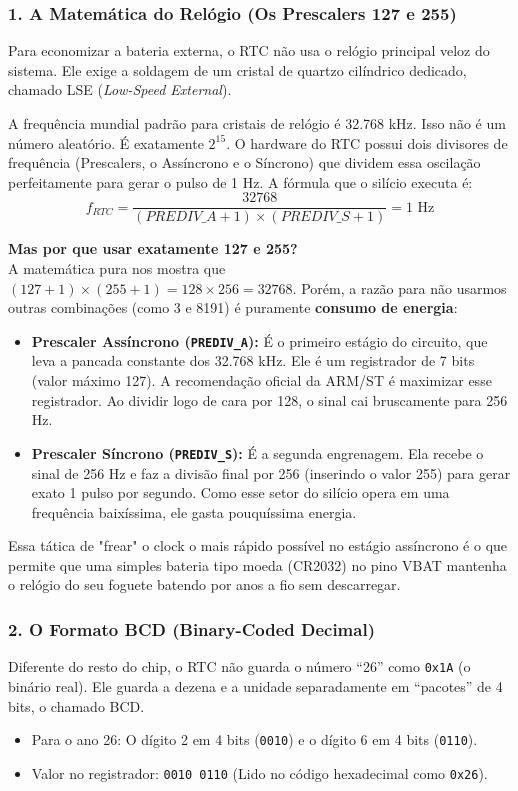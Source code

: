 \documentclass[12pt,a4paper]{article}
\begin{document}
\subsubsection*{1. A Matemática do Relógio (Os Prescalers 127 e 255)}
Para economizar a bateria externa, o RTC não usa o relógio principal veloz do sistema. Ele exige a soldagem de um cristal de quartzo cilíndrico dedicado, chamado LSE (\textit{Low-Speed External}).

A frequência mundial padrão para cristais de relógio é 32.768 kHz. Isso não é um número aleatório. É exatamente $2^{15}$. O hardware do RTC possui dois divisores de frequência (Prescalers, o Assíncrono e o Síncrono) que dividem essa oscilação perfeitamente para gerar o pulso de 1 Hz. A fórmula que o silício executa é:
$$f_{RTC} = \frac{32768}{(PREDIV\_A + 1) \times (PREDIV\_S + 1)} = 1 \text{ Hz}$$

\textbf{Mas por que usar exatamente 127 e 255?} \\
A matemática pura nos mostra que $(127 + 1) \times (255 + 1) = 128 \times 256 = 32768$. Porém, a razão para não usarmos outras combinações (como 3 e 8191) é puramente \textbf{consumo de energia}:
\begin{itemize}
    \item \textbf{Prescaler Assíncrono (\texttt{PREDIV\_A}):} É o primeiro estágio do circuito, que leva a pancada constante dos 32.768 kHz. Ele é um registrador de 7 bits (valor máximo 127). A recomendação oficial da ARM/ST é maximizar esse registrador. Ao dividir logo de cara por 128, o sinal cai bruscamente para 256 Hz.
    \item \textbf{Prescaler Síncrono (\texttt{PREDIV\_S}):} É a segunda engrenagem. Ela recebe o sinal de 256 Hz e faz a divisão final por 256 (inserindo o valor 255) para gerar exato 1 pulso por segundo. Como esse setor do silício opera em uma frequência baixíssima, ele gasta pouquíssima energia.
\end{itemize}
Essa tática de "frear" o clock o mais rápido possível no estágio assíncrono é o que permite que uma simples bateria tipo moeda (CR2032) no pino VBAT mantenha o relógio do seu foguete batendo por anos a fio sem descarregar.

\subsubsection*{2. O Formato BCD (Binary-Coded Decimal)}
Diferente do resto do chip, o RTC não guarda o número ``26'' como \texttt{0x1A} (o binário real). Ele guarda a dezena e a unidade separadamente em ``pacotes'' de 4 bits, o chamado BCD.
\begin{itemize}
    \item Para o ano 26: O dígito 2 em 4 bits (\texttt{0010}) e o dígito 6 em 4 bits (\texttt{0110}).
    \item Valor no registrador: \texttt{0010 0110} (Lido no código hexadecimal como \texttt{0x26}).
\end{itemize}
\end{document}
